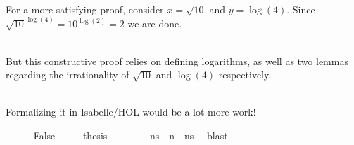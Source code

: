 \documentclass{beamer}
\begin{document}
\begin{frame}{\insertsubsectionhead\
    \textemdash\ \insertsubsubsectionhead}
  \framebreak

  For a more satisfying proof, consider $x = \sqrt{10}$ and
  $y = \log(4)$.  Since \(\sqrt{10}^{\log(4)} = 10^{\log(2)} = 2\) we
  are done.\\~\

  But this constructive proof relies on defining logarithms, as well
  as two lemmas regarding the irrationality of $\sqrt{10}$ and
  $\log(4)$ respectively.\\~\

  Formalizing it in Isabelle/HOL would be a lot more work!

  \framebreak


  \begin{tcolorbox}
    \begin{isabellebody}
      \ \ \ \ \isamarkupfalse%
      \ False\isanewline \ \ \ \ \isamarkupfalse%
      \ {\isacharquery}thesis\isanewline \ \ \ \ \ \
      \isamarkupfalse%
      \ {\isasymdagger}\ {\isacartoucheopen}ns\ {\isacharequal}\ n\
      {\isacharhash}\ ns{\isacharprime}{\isacartoucheclose}\
      \isamarkupfalse%
      \ blast
    \end{isabellebody}
  \end{tcolorbox}

  \framebreak


\end{frame}
\end{document}
